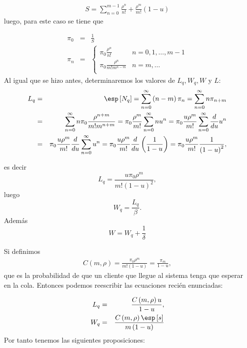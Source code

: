 \begin{eqnarray}
S=\sum_{n=0}^{m-1}\frac{\rho^{n}}{n!}+\frac{\rho^{m}}{m!}\left(1-u\right)
\end{eqnarray}
luego, para este caso se tiene que

\begin{eqnarray}
\pi_{0}&=&\frac{1}{S}\\
\pi_{n}&=&\left\{\begin{array}{cc}
\pi_{0}\frac{\rho^{n}}{n!} & n=0,1,\ldots,m-1\\
\pi_{0}\frac{\rho^{n}}{m!m^{n-m}}& n=m,\ldots\\
\end{array}\right.
\end{eqnarray}
Al igual que se hizo antes, determinaremos los valores de
$L_{q},W_{q},W$ y $L$:
\begin{eqnarray*}
L_{q}&=&\esp\left[N_{q}\right]=\sum_{n=0}^{\infty}\left(n-m\right)\pi_{n}=\sum_{n=0}^{\infty}n\pi_{n+m}\\
&=&\sum_{n=0}^{\infty}n\pi_{0}\frac{\rho^{n+m}}{m!m^{n+m}}=\pi_{0}\frac{\rho^{m}}{m!}\sum_{n=0}^{\infty}nu^{n}=\pi_{0}\frac{u\rho^{m}}{m!}\sum_{n=0}^{\infty}\frac{d}{du}u^{n}\\
&=&\pi_{0}\frac{u\rho^{m}}{m!}\frac{d}{du}\sum_{n=0}^{\infty}u^{n}=\pi_{0}\frac{u\rho^{m}}{m!}\frac{d}{du}\left(\frac{1}{1-u}\right)=\pi_{0}\frac{u\rho^{m}}{m!}\frac{1}{\left(1-u\right)^{2}},
\end{eqnarray*}

es decir
\begin{equation}
L_{q}=\frac{u\pi_{0}\rho^{m}}{m!\left(1-u\right)^{2}},
\end{equation}
luego
\begin{equation}
W_{q}=\frac{L_{q}}{\beta}.
\end{equation}
Adem\'as
\begin{equation}
W=W_{q}+\frac{1}{\delta}
\end{equation}

Si definimos
\begin{eqnarray}
C\left(m,\rho\right)=\frac{\pi_{0}\rho^{m}}{m!\left(1-u\right)}=\frac{\pi_{m}}{1-u},
\end{eqnarray}
que es la probabilidad de que un cliente que llegue al sistema
tenga que esperar en la cola. Entonces podemos reescribir las
ecuaciones reci\'en enunciadas:

\begin{eqnarray}
L_{q}&=&\frac{C\left(m,\rho\right)u}{1-u},\\
W_{q}&=&\frac{C\left(m,\rho\right)\esp\left[s\right]}{m\left(1-u\right)}\\
\end{eqnarray}
Por tanto tenemos las siguientes proposiciones:

